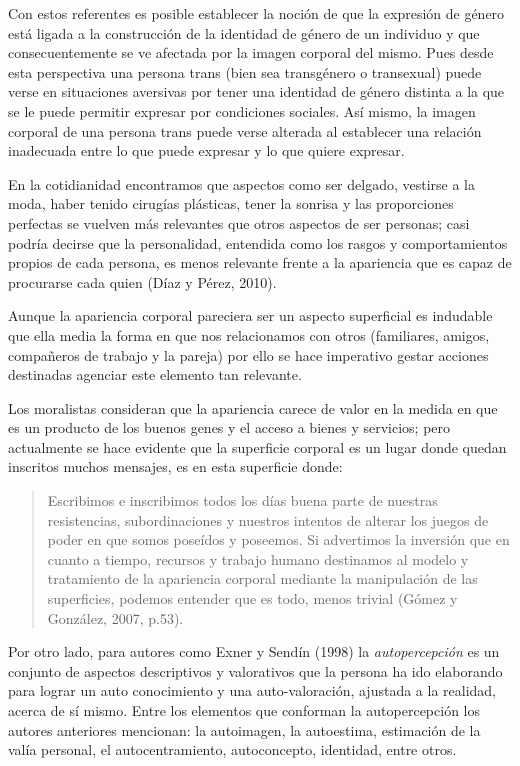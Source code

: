 Con estos referentes es posible establecer la noción de que la expresión de
género está ligada a la construcción de la identidad de género de un individuo y
que consecuentemente se ve afectada por la imagen corporal del mismo.
Pues desde esta perspectiva una persona trans (bien sea transgénero o
transexual) puede verse en situaciones aversivas por tener una identidad de
género distinta a la que se le puede permitir expresar por condiciones sociales.
Así mismo, la imagen corporal de una persona trans puede verse alterada al
establecer una relación inadecuada entre lo que puede expresar y lo que quiere
expresar.

En la cotidianidad encontramos que aspectos como ser delgado, vestirse a la
moda, haber tenido cirugías plásticas, tener la sonrisa y las proporciones
perfectas se vuelven más relevantes que otros aspectos de ser personas;
casi podría decirse que la personalidad, entendida como los rasgos y
comportamientos propios de cada persona, es menos relevante frente a la
apariencia que es capaz de procurarse cada quien (Díaz y Pérez, 2010).

Aunque la apariencia corporal pareciera ser un aspecto superficial es indudable
que ella media la forma en que nos relacionamos con otros (familiares, amigos,
compañeros de trabajo y la pareja) por ello se hace imperativo gestar acciones
destinadas agenciar este elemento tan relevante.

Los moralistas consideran que la apariencia carece de valor en la medida en que
es un producto de los buenos genes y el acceso a bienes y servicios;
pero actualmente se hace evidente que la superficie corporal es un lugar
donde quedan inscritos muchos mensajes, es en esta superficie donde:

\begin{quote}
Escribimos e inscribimos todos los días buena parte de nuestras
resistencias, subordinaciones y nuestros intentos de alterar los juegos de
poder en que somos poseídos y poseemos.
Si advertimos la inversión que en cuanto a tiempo, recursos y trabajo humano
destinamos al modelo y tratamiento de la apariencia corporal mediante la
manipulación de las superficies, podemos entender que es todo, menos trivial
(Gómez y González, 2007, p.53).
\end{quote}

Por otro lado, para autores como Exner y Sendín (1998) la \emph{autopercepción}
es un
conjunto de aspectos descriptivos y valorativos que la persona ha ido elaborando
para lograr un auto conocimiento y una auto-valoración, ajustada a la realidad,
acerca de sí mismo.
Entre los elementos que conforman la autopercepción los autores
anteriores mencionan: la autoimagen, la autoestima, estimación de la valía
personal, el autocentramiento, autoconcepto, identidad, entre otros.

